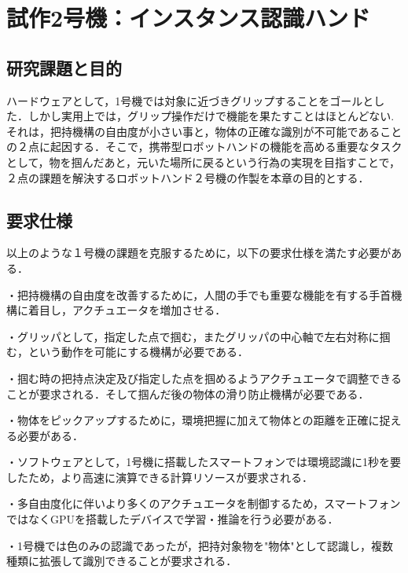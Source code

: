 \chapter{試作2号機：インスタンス認識ハンド}
\newpage

\section{研究課題と目的}
ハードウェアとして，1号機では対象に近づきグリップすることをゴールとした．しかし実用上では，グリップ操作だけで機能を果たすことはほとんどない. それは，把持機構の自由度が小さい事と，物体の正確な識別が不可能であることの２点に起因する．そこで，携帯型ロボットハンドの機能を高める重要なタスクとして，物を掴んだあと，元いた場所に戻るという行為の実現を目指すことで，２点の課題を解決するロボットハンド２号機の作製を本章の目的とする．

\section{要求仕様}
以上のような１号機の課題を克服するために，以下の要求仕様を満たす必要がある．

・把持機構の自由度を改善するために，人間の手でも重要な機能を有する手首機構に着目し，アクチュエータを増加させる．%

・グリッパとして，指定した点で掴む，またグリッパの中心軸で左右対称に掴む，という動作を可能にする機構が必要である．

・掴む時の把持点決定及び指定した点を掴めるようアクチュエータで調整できることが要求される．そして掴んだ後の物体の滑り防止機構が必要である．


・物体をピックアップするために，環境把握に加えて物体との距離を正確に捉える必要がある．

・ソフトウェアとして，1号機に搭載したスマートフォンでは環境認識に1秒を要したため，より高速に演算できる計算リソースが要求される．

・多自由度化に伴いより多くのアクチュエータを制御するため，スマートフォンではなくGPUを搭載したデバイスで学習・推論を行う必要がある．

・1号機では色のみの認識であったが，把持対象物を"物体"として認識し，複数種類に拡張して識別できることが要求される．


